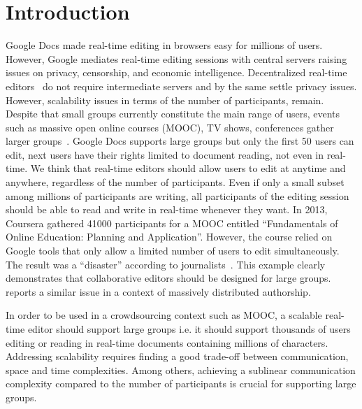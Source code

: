 

\section{Introduction}

Google Docs made real-time editing in browsers easy for millions of
users. However, Google mediates real-time editing sessions with
central servers raising issues on privacy, censorship, and economic
intelligence. Decentralized real-time editors~\cite{oster2006data,
  sun1998operational, sun2009contextbased} do not require intermediate
servers and by the same settle privacy issues. However, scalability
issues in terms of the number of participants, remain.  Despite that
small groups currently constitute the main range of users, events such
as massive open online courses (MOOC), TV shows, conferences gather
larger groups~\cite{breslow2013studying}.  Google Docs supports large
groups but only the first 50 users can edit, next users have their
rights limited to document reading, not even in real-time.  We think
that real-time editors should allow users to edit at anytime and
anywhere, regardless of the number of participants. Even if only a
small subset among millions of participants are writing, all
participants of the editing session should be able to read and write
in real-time whenever they want. In 2013, Coursera gathered 41000
participants for a MOOC entitled ``Fundamentals of Online Education:
Planning and Application''. However, the course relied on Google tools
that only allow a limited number of users to edit simultaneously.  The result
was a ``disaster'' according to journalists~\cite{slate13,wp13}. This example
clearly demonstrates that collaborative editors should be designed for large
groups. \cite{chi12} reports a similar issue in a context of massively
distributed authorship.

In order to be used in a crowdsourcing context such as MOOC, a
scalable real-time editor should support large groups i.e. it should
support thousands of users editing or reading in real-time documents
containing millions of characters. Addressing scalability requires
finding a good trade-off between communication, space and time
complexities. Among others, achieving a sublinear communication
complexity compared to the number of participants is crucial for
supporting large groups.

